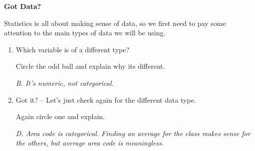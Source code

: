 \def\theTopic{Descriptive Stats }
\def\dayNum{2}

\begin{center}
{\bf {\large Got Data?}}
\end{center}
 

Statistics is all about making sense of data, so we first need to pay
some attention to the main types of data we will be using.

\begin{enumerate}
  \item Which  variable is of a  different type?
     Circle the odd ball and explain why its different.
\begin{students}
    \vspace{1cm}    
\end{students}

\begin{key}
  {\it B.  It's numeric, not categorical.}       
\end{key}

\item Got it?  -- Let's just check again for the different data type.
   Again circle one and explain.
\begin{students}
    \vspace{1cm}
\end{students}

\begin{key}
  {\it D.  Area code is categorical. Finding an average for the class
    makes sense for the others, but average area code is meaningless.}       
\end{key}
\end{enumerate}

